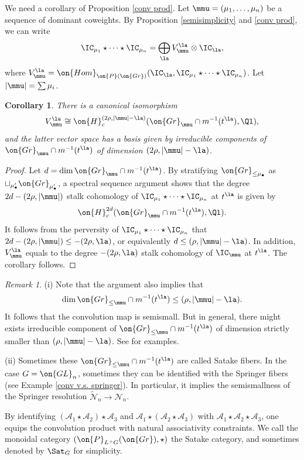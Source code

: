 \documentclass[]{pcmi}
\theoremstyle{plain}
\newtheorem{cor}[equation]{Corollary}
\theoremstyle{remark}
\newtheorem{rmk}[equation]{Remark}
\theoremstyle{definition}
\newcommand{\mA}{{\mathcal A}}
\newcommand{\mN}{{\mathcal N}}
\newcommand{\Gr}{{\on{Gr}}}
\newcommand{\Hom}{{\on{Hom}}}
\newcommand{\GL}{{\on{GL}}}
\begin{document}
We need a corollary of Proposition \ref{conv prod}.
Let $\mmu=(\mu_1,\ldots,\mu_n)$ be a sequence of dominant coweights. By Proposition \ref{semisimplicity} and \ref{conv prod}, we can write
\[\IC_{\mu_1}\star\cdots\star\IC_{\mu_n}=\bigoplus_{\la} V_{\mmu}^\la\otimes \IC_\la,\]
where $V_{\mmu}^\la=\Hom_{\on{P}(\Gr)}(\IC_\la, \IC_{\mu_1}\star\cdots\star\IC_{\mu_n})$. Let $|\mmu|=\sum \mu_i$.
\begin{cor}\label{Satake fiber}
There is a canonical isomorphism
\[V_{\mmu}^\la\cong \on{H}^{(2\rho,|\mmu|-\la)}_c(\Gr_{\mmu}\cap m^{-1}(t^\la),\Ql),\]
and the latter vector space has a basis given by irreducible components of $\Gr_{\mmu}\cap m^{-1}(t^\la)$ of dimension $(2\rho,|\mmu|-\la)$.
\end{cor}
\begin{proof}Let $d=\dim \Gr_{\mmu}\cap m^{-1}(t^\la)$. By stratifying $\Gr_{\leq \mu_\bullet}$ as $\sqcup_{\mu'_\bullet}\Gr_{\mu'_\bullet}$,
a spectral sequence argument shows that the degree $2d- (2\rho,|\mmu|)$ stalk cohomology of $\IC_{\mu_1}\star\cdots\star\IC_{\mu_n}$ at $t^\la$ is given by
$$\on{H}^{2d}_c(\Gr_{\mmu}\cap m^{-1}(t^\la),\Ql).$$
It follows from the perversity of $\IC_{\mu_1}\star\cdots\star\IC_{\mu_n}$ that $2d- (2\rho,|\mmu|)\leq -(2\rho,\la)$, or equivalently  $d\leq (\rho,|\mmu|-\la)$. In addition, $V_{\mmu}^\la$ equals to the degree $-(2\rho,\la)$ stalk cohomology of $\IC_{\mmu}$ at $t^\la$. The corollary follows.
\end{proof}
\begin{rmk}\label{semismall} 
(i) Note that the argument also implies that 
\[\dim  \Gr_{\leq \mmu}\cap m^{-1}(t^{\la})\leq (\rho,|\mmu|-\la).\]
It follows that the convolution map is semismall. But in general, there might exists irreducible component of $\Gr_{\leq \mmu}\cap m^{-1}(t^{\la})$ of dimension strictly smaller than $(\rho,|\mmu|-\la)$. See \cite[Remark 4.3, 8.3]{Ha} for examples.

(ii) Sometimes these $ \Gr_{\leq \mmu}\cap m^{-1}(t^{\la})$ are called Satake fibers. In the case $G=\GL_n$, sometimes they can be identified with the Springer fibers (see Example \ref{conv v.s. springer}). In particular, it implies the semismallness of the Springer resolution $\tilde\mN_n\to \mN_n$.
\end{rmk}




By identifying $(\mA_1\star\mA_2)\star\mA_3$ and $\mA_1\star(\mA_2\star\mA_3)$ with $\mA_1\star\mA_2\star\mA_3$, one equips the convolution product with natural associativity constraints. We call the monoidal category $(\on{P}_{L^+G}(\Gr),\star)$ the Satake category, and sometimes denoted by $\Sat_G$ for simplicity.
\end{document}
